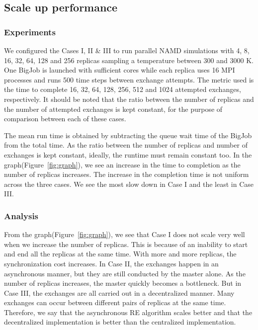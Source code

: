 \documentclass[a4paper,10pt]{article}
\begin{document}

\subsection{Scale up performance}

\subsubsection{Experiments}
We configured the Cases I, II \& III to run parallel NAMD simulations with 4, 8, 16, 32, 64, 128 and 256 replicas sampling a temperature between 300 and 3000 K. One BigJob is launched with sufficient cores while each replica uses 16 MPI processes and runs 500 time steps between exchange attempts. The metric used is the time to complete 16, 32, 64, 128, 256, 512 and 1024 attempted exchanges, respectively. It should be noted that the ratio between the number of replicas and the number of attempted exchanges is kept constant, for the purpose of comparison between each of these cases.  %

The mean run time is obtained by subtracting the queue wait time of the BigJob from the total time. As the ratio between the number of replicas and number of exchanges is kept constant, ideally, the runtime must remain constant too. In the graph(Figure~\ref{fig:graph}), we see an increase in the time to completion as the number of replicas increases. The increase in the completion time is not uniform across the three cases. We see the most slow down in Case I and the least in Case III.

\subsubsection{Analysis}
From the graph(Figure~\ref{fig:graph}), we see that Case I does not scale very well when we increase the number of replicas. This is because of an inability to start and end all the replicas at the same time. With more and more replicas, the synchronization cost increases. 
In Case II, the exchanges happen in an asynchronous manner, but they are still conducted by the master alone. As the number of replicas increases, the master quickly becomes a bottleneck. But in Case III, the exchanges are all carried out in a decentralized manner. Many exchanges can occur between different pairs of replicas at the same time. Therefore, we say that the asynchronous RE algorithm scales better and that the decentralized implementation is better than the centralized implementation.
\end{document}
